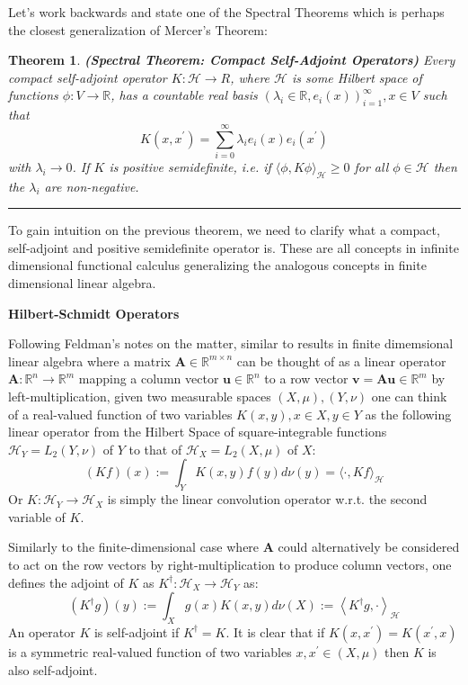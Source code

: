 \documentclass[11pt]{article}
\theoremstyle{plain} %
\newtheorem{theorem}{Theorem}[section]
\theoremstyle{remark}
\begin{document}
Let's work backwards and state one of the Spectral Theorems which is perhaps the
closest generalization of Mercer's Theorem:

\begin{theorem}\textbf{(Spectral Theorem: Compact Self-Adjoint Operators)}
  Every compact self-adjoint operator $K: \mathcal{H} \rightarrow R$, where
$\mathcal{H}$ is some Hilbert space of functions $\phi: V \rightarrow
  \mathbb{R}$, has a countable real basis $\left(\lambda_{i} \in \mathbb{R},
  e_{i}(x)\right)_{i=1}^{\infty}, x \in V$ such that
$$
  K\left(x, x^{\prime}\right)=\sum_{i=0}^{\infty} \lambda_{i} e_{i}(x) e_{i}\left(x^{\prime}\right)
$$
with $\lambda_{i} \rightarrow 0$. If $K$ is positive semidefinite, i.e. if
$\langle\phi, K \phi\rangle_{\mathcal{H}} \geq 0$ for all $\phi \in \mathcal{H}$
then the $\lambda_{i}$ are non-negative.
\end{theorem}
\vspace*{0.4em}
\hrule

To gain intuition on the previous theorem, we need to clarify what a compact,
self-adjoint and positive semidefinite operator is. These are all concepts in
infinite dimensional functional calculus generalizing the analogous concepts in
finite dimensional linear algebra.

\textbf{Hilbert-Schmidt Operators}

Following Feldman's notes on the matter, similar to results in finite
dimemsional linear algebra where a matrix $\mathbf{A} \in \mathbb{R}^{m \times
    n}$ can be thought of as a linear operator $\mathbf{A}: \mathbb{R}^{n}
  \rightarrow \mathbb{R}^{m}$ mapping a column vector $\mathbf{u} \in
  \mathbb{R}^{n}$ to a row vector $\mathbf{v}=\mathbf{A} \mathbf{u} \in
  \mathbb{R}^{m}$ by left-multiplication, given two measurable spaces $(X,
  \mu),(Y, \nu)$ one can think of a real-valued function of two variables $K(x,
  y), x \in X, y \in Y$ as the following linear operator from the Hilbert Space of
square-integrable functions $\mathcal{H}_{Y}=L_{2}(Y, \nu)$ of $Y$ to that of
$\mathcal{H}_{X}=L_{2}(X, \mu)$ of $X$:
$$
  (K f)(x):=\int_{Y} K(x, y) f(y) d \nu(y)=\langle\cdot, K f\rangle_{\mathcal{H}}
$$
Or $K: \mathcal{H}_{Y} \rightarrow \mathcal{H}_{X}$ is simply the linear
convolution operator w.r.t. the second variable of $K$.

Similarly to the finite-dimensional case where $\mathbf{A}$ could alternatively
be considered to act on the row vectors by right-multiplication to produce
column vectors, one defines the adjoint of $K$ as $K^{\dagger}: \mathcal{H}_{X}
  \rightarrow \mathcal{H}_{Y}$ as:
$$
  \left(K^{\dagger} g\right)(y):=\int_{X} g(x) K(x, y) d \nu(X):=\left\langle K^{\dagger} g, \cdot\right\rangle_{\mathcal{H}}
$$
An operator $K$ is self-adjoint if $K^{\dagger}=K$. It is clear that if
$K\left(x, x^{\prime}\right)=K\left(x^{\prime}, x\right)$ is a symmetric
real-valued function of two variables $x, x^{\prime} \in(X, \mu)$ then $K$ is
also self-adjoint.
\end{document}
